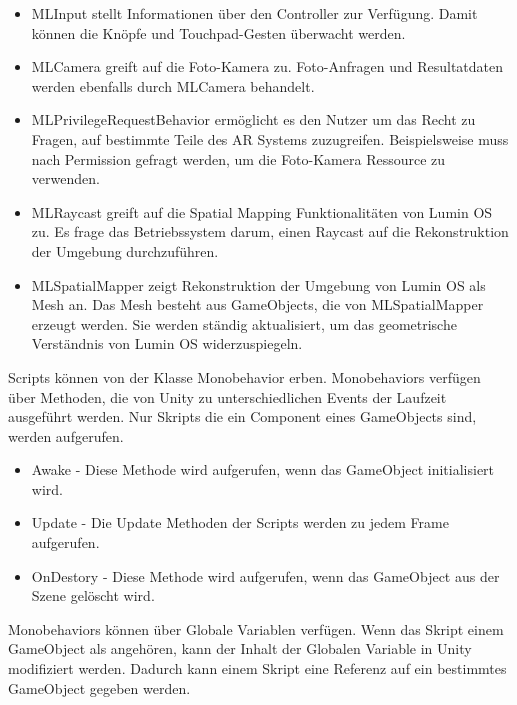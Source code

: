 \begin{itemize}
	\item MLInput stellt Informationen über den Controller zur Verfügung. Damit können die Knöpfe und Touchpad-Gesten überwacht werden.
	\item MLCamera greift auf die Foto-Kamera zu. Foto-Anfragen und Resultatdaten werden ebenfalls durch MLCamera behandelt.
	\item MLPrivilegeRequestBehavior ermöglicht es den Nutzer um das Recht zu Fragen, auf bestimmte Teile des AR Systems zuzugreifen. Beispielsweise muss nach Permission gefragt werden, um die Foto-Kamera Ressource zu verwenden. 
	\item MLRaycast greift auf die Spatial Mapping Funktionalitäten von Lumin OS zu. Es frage das Betriebssystem darum, einen Raycast auf die Rekonstruktion der Umgebung durchzuführen. 
	\item MLSpatialMapper zeigt Rekonstruktion der Umgebung von Lumin OS als Mesh an. Das Mesh besteht aus GameObjects, die von MLSpatialMapper erzeugt werden. Sie werden ständig aktualisiert, um das geometrische Verständnis von Lumin OS widerzuspiegeln.
\end{itemize}

Scripts können von der Klasse Monobehavior erben. Monobehaviors verfügen über Methoden, die von Unity zu unterschiedlichen Events der Laufzeit ausgeführt werden. Nur Skripts die ein Component eines GameObjects sind, werden aufgerufen.

\begin{itemize}
	\item Awake - Diese Methode wird aufgerufen, wenn das GameObject initialisiert wird. %
	\item Update - Die Update Methoden der Scripts werden zu jedem Frame aufgerufen.
	\item OnDestory - Diese Methode wird aufgerufen, wenn das GameObject aus der Szene gelöscht wird.
\end{itemize}

Monobehaviors können über Globale Variablen verfügen. Wenn das Skript einem GameObject als angehören, kann der Inhalt der Globalen Variable in Unity modifiziert werden. Dadurch kann einem Skript eine Referenz auf ein bestimmtes GameObject gegeben werden. %

